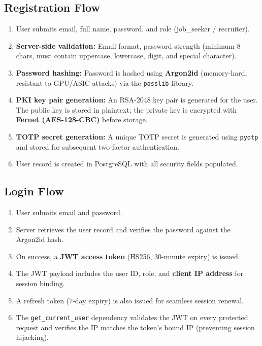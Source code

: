 \documentclass[12pt,a4paper]{article}
\begin{document}
\subsection{Registration Flow}
\begin{enumerate}
  \item User submits email, full name, password, and role (job\_seeker / recruiter).
  \item \textbf{Server-side validation:} Email format, password strength (minimum 8 chars, must contain uppercase, lowercase, digit, and special character).
  \item \textbf{Password hashing:} Password is hashed using \textbf{Argon2id} (memory-hard, resistant to GPU/ASIC attacks) via the \texttt{passlib} library.
  \item \textbf{PKI key pair generation:} An RSA-2048 key pair is generated for the user. The public key is stored in plaintext; the private key is encrypted with \textbf{Fernet (AES-128-CBC)} before storage.
  \item \textbf{TOTP secret generation:} A unique TOTP secret is generated using \texttt{pyotp} and stored for subsequent two-factor authentication.
  \item User record is created in PostgreSQL with all security fields populated.
\end{enumerate}

\subsection{Login Flow}
\begin{enumerate}
  \item User submits email and password.
  \item Server retrieves the user record and verifies the password against the Argon2id hash.
  \item On success, a \textbf{JWT access token} (HS256, 30-minute expiry) is issued.
  \item The JWT payload includes the user ID, role, and \textbf{client IP address} for session binding.
  \item A refresh token (7-day expiry) is also issued for seamless session renewal.
  \item The \texttt{get\_current\_user} dependency validates the JWT on every protected request and verifies the IP matches the token's bound IP (preventing session hijacking).
\end{enumerate}
\end{document}
